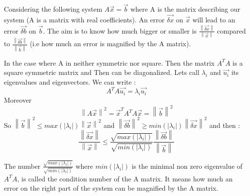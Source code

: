 Considering the following system $A\vec{x}=\vec{b}$ where A is the
matrix describing our system (A is a matrix with real coefficients). An error $\vec{\delta x}$ on $\vec{x}$
will lead to an error $\vec{\delta b}$ on $\vec{b}$. The aim is to
know how much bigger or smaller is $\frac{\left\|\vec{\delta x}
  \right\|}{\left\|\vec{x} \right\|}$ compared to $\frac{\left\|\vec{\delta b}
  \right\|}{\left\|\vec{b} \right\|}$ (i.e how much an error is
magnified by the A matrix).

In the case where A in neither symmetric nor square. Then the matrix
$A^TA$ is a square symmetric matrix and Then can be diagonalized. Lets
call $\lambda_i$ and $\vec{u_i}$ its eigenvalues and eigenvectors. We
can write : $$ A^TA \vec{u_i} = \lambda_i \vec{u_i}$$
Moreover $$\left\| A\vec{x}\right\|^2 = \vec{x}^TA^TA\vec{x} =
\left\| \vec{b}\right\|^2$$
So $\left\| \vec{b} \right\|^2 \leq max(|\lambda_i|) \left\| \vec{x}
\right\|^2$ and $\left\| \vec{\delta b} \right\|^2 \geq
min(|\lambda_i|) \left\| \vec{\delta x}
\right\|^2$ and then :
$$\boxed{
\frac{\left\|\vec{\delta x}
  \right\|}{\left\|\vec{x} \right\|} \leq \frac{\sqrt{max(|\lambda_i|)}}{\sqrt{min(|\lambda_i|)}} \frac{\left\|\vec{\delta b}
  \right\|}{\left\|\vec{b} \right\|}
}$$

The number $\frac{\sqrt{max(|\lambda_i|)}}{\sqrt{min(|\lambda_i|)}}$
where $min(|\lambda_i|)$ is the minimal non zero eigenvalue of $A^TA$,
is called the condition number of the A matrix. It means how much an
error on the right part of the system can be magnified by the A matrix.
